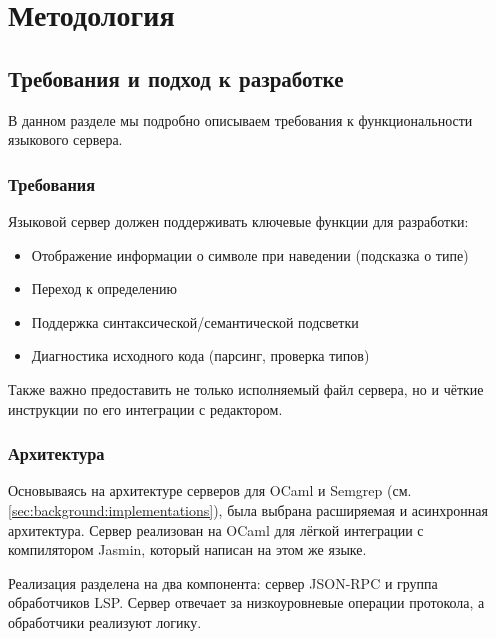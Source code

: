 \chapter{Методология}
\label{chap:met}

\section{Требования и подход к разработке}

В данном разделе мы подробно описываем требования к функциональности языкового
сервера.

\subsection*{Требования}
\label{chap:met:requierements}

Языковой сервер должен поддерживать ключевые функции для разработки:
\begin{itemize}
  \item Отображение информации о символе при наведении (подсказка о типе)
  \item Переход к определению
  \item Поддержка синтаксической/семантической подсветки
  \item Диагностика исходного кода (парсинг, проверка типов)
\end{itemize}

Также важно предоставить не только исполняемый файл сервера, но и чёткие
инструкции по его интеграции с редактором.

\subsection*{Архитектура}

Основываясь на архитектуре серверов для OCaml и Semgrep (см.
\ref{sec:background:implementations}), была выбрана расширяемая и асинхронная
архитектура. Сервер реализован на OCaml для лёгкой интеграции с компилятором
Jasmin, который написан на этом же языке.

Реализация разделена на два компонента: сервер JSON-RPC и группа обработчиков
LSP. Сервер отвечает за низкоуровневые операции протокола, а обработчики
реализуют логику.

